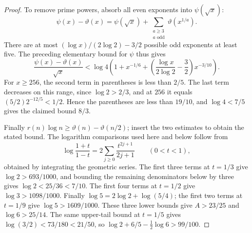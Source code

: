 \documentclass[11pt]{article}
\numberwithin{equation}{section}
\theoremstyle{definition}\newtheorem{definition}[theorem]{Definition}
\theoremstyle{remark}\newtheorem{remark}[theorem]{Remark}
\begin{document}
\begin{proof}
To remove prime powers, absorb all even exponents into $\psi(\sqrt x)$:
\[
 \psi(x)-\vartheta(x)
 =\psi(\sqrt x)+\sum_{\substack{a\ge3\\a\text{ odd}}}
                       \vartheta(x^{1/a}).
\]
There are at most $(\log x)/(2\log2)-3/2$ possible odd exponents at
least five. The preceding elementary bound for $\psi$ thus gives
\[
 \frac{\psi(x)-\vartheta(x)}{\sqrt x}
 <\log4\left(1+x^{-1/6}+
       \left(\frac{\log x}{2\log2}-\frac32\right)x^{-3/10}\right).
\]
For $x\ge256$, the second term in parentheses is less than $2/5$.
The last term decreases on this range, since $\log2>2/3$, and at $256$
it equals $(5/2)2^{-12/5}<1/2$. Hence the parentheses are less than
$19/10$, and $\log4<7/5$ gives the claimed bound $8/3$.

Finally $r(n)\log n\ge\vartheta(n)-\vartheta(n/2)$; insert the two
estimates to obtain the stated bound. The logarithm comparisons used
here and below follow from
\[
 \log\frac{1+t}{1-t}=2\sum_{j\ge0}\frac{t^{2j+1}}{2j+1}
 \qquad(0<t<1),
\]
obtained by integrating the geometric series. The first three terms at
$t=1/3$ give $\log2>693/1000$, and bounding the remaining denominators
below by three gives $\log2<25/36<7/10$.
The first four terms at $t=1/2$ give $\log3>1098/1000$.
Finally $\log5=2\log2+\log(5/4)$; the first two terms at $t=1/9$
give $\log5>1609/1000$. These three lower bounds give $A>23/25$
and $\log6>25/14$. The same upper-tail bound at $t=1/5$ gives
$\log(3/2)<73/180<21/50$, so
$\log2+6/5-\tfrac12\log6>99/100$.
\end{proof}
\end{document}
